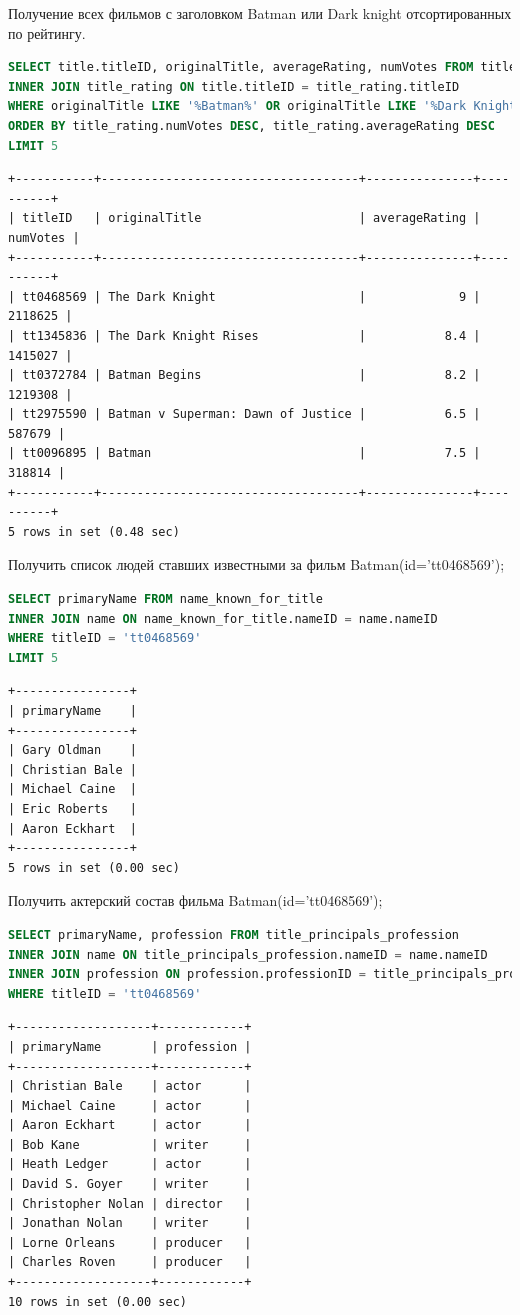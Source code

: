 \documentclass[12pt,a4paper]{article}
\begin{document}
Получение всех фильмов с заголовком Batman или Dark knight отсортированных по рейтингу.
\begin{lstlisting}[language=SQL]
SELECT title.titleID, originalTitle, averageRating, numVotes FROM title
INNER JOIN title_rating ON title.titleID = title_rating.titleID
WHERE originalTitle LIKE '%Batman%' OR originalTitle LIKE '%Dark Knight%' AND titleType = 'movie'
ORDER BY title_rating.numVotes DESC, title_rating.averageRating DESC
LIMIT 5
\end{lstlisting}
\begin{lstlisting}[basicstyle = \tiny\ttfamily, columns = fixed]
+-----------+------------------------------------+---------------+----------+
| titleID   | originalTitle                      | averageRating | numVotes |
+-----------+------------------------------------+---------------+----------+
| tt0468569 | The Dark Knight                    |             9 |  2118625 |
| tt1345836 | The Dark Knight Rises              |           8.4 |  1415027 |
| tt0372784 | Batman Begins                      |           8.2 |  1219308 |
| tt2975590 | Batman v Superman: Dawn of Justice |           6.5 |   587679 |
| tt0096895 | Batman                             |           7.5 |   318814 |
+-----------+------------------------------------+---------------+----------+
5 rows in set (0.48 sec)
\end{lstlisting}
Получить список людей ставших известными за фильм Batman(id='tt0468569');
\begin{lstlisting}[language=SQL]
SELECT primaryName FROM name_known_for_title 
INNER JOIN name ON name_known_for_title.nameID = name.nameID
WHERE titleID = 'tt0468569'
LIMIT 5
\end{lstlisting}
\begin{lstlisting}[basicstyle = \tiny\ttfamily, columns = fixed]
+----------------+
| primaryName    |
+----------------+
| Gary Oldman    |
| Christian Bale |
| Michael Caine  |
| Eric Roberts   |
| Aaron Eckhart  |
+----------------+
5 rows in set (0.00 sec)
\end{lstlisting}
Получить актерский состав фильма Batman(id='tt0468569');
\begin{lstlisting}[language=SQL]
SELECT primaryName, profession FROM title_principals_profession
INNER JOIN name ON title_principals_profession.nameID = name.nameID
INNER JOIN profession ON profession.professionID = title_principals_profession.professionID
WHERE titleID = 'tt0468569'
\end{lstlisting}
\begin{lstlisting}[basicstyle = \tiny\ttfamily, columns = fixed]
+-------------------+------------+
| primaryName       | profession |
+-------------------+------------+
| Christian Bale    | actor      |
| Michael Caine     | actor      |
| Aaron Eckhart     | actor      |
| Bob Kane          | writer     |
| Heath Ledger      | actor      |
| David S. Goyer    | writer     |
| Christopher Nolan | director   |
| Jonathan Nolan    | writer     |
| Lorne Orleans     | producer   |
| Charles Roven     | producer   |
+-------------------+------------+
10 rows in set (0.00 sec)
\end{lstlisting}
\end{document}
